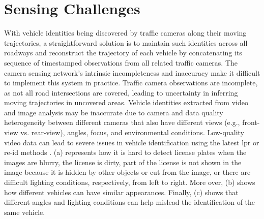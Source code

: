 \section{Sensing Challenges}
\label{sec:sensing-challenges}

With vehicle identities being discovered by traffic cameras along their moving trajectories, a straightforward solution is to maintain such identities across all roadways and reconstruct the trajectory of each vehicle by concatenating its sequence of timestamped observations from all related traffic cameras. 
The camera sensing network's intrinsic incompleteness and inaccuracy make it difficult to implement this system in practice.
Traffic camera observations are incomplete, as not all road intersections are covered, leading to uncertainty in inferring moving trajectories in uncovered areas.
Vehicle identities extracted from video and image analysis may be inaccurate due to camera and data quality heterogeneity between different cameras that also have different views (e.g., front-view vs. rear-view), angles, focus, and environmental conditions.
Low-quality video data can lead to severe issues in vehicle identification using the latest \ac{lpr} or \ac{re-id} methods \cite{zhou2018aware}.
(a) represents how it is hard to detect license plates when the images are blurry, the license is dirty, part of the license is not shown in the image because it is hidden by other objects or cut from the image, or there are difficult lighting conditions, respectively, from left to right.
More over, (b) shows how different vehicles can have similar appearances.
Finally, (c) shows that different angles and lighting conditions can help mislead the identification of the same vehicle.

